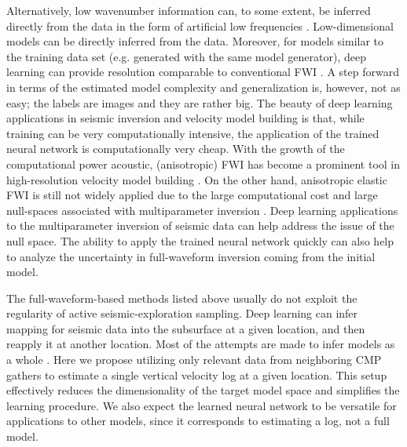 \documentclass[paper,twocolomn]{geophysics}
\begin{document}
Alternatively, low wavenumber information can, to some extent, be inferred directly from the data in the form of artificial low frequencies \citep{ovcharenkoNeuralNetworkBased2017, ovcharenkoLowFrequencyDataExtrapolation2018, ovcharenko2019deep, jin2018learn, sunLowFrequencyExtrapolation2018, sun2019extrapolated, kazei2019realistically}. Low-dimensional models \citep[e.g.][]{polo2018, wu2018inversionnet} can be directly inferred from the data. Moreover, for models similar to the training data set (e.g. generated with the same model generator), deep learning can provide resolution comparable to conventional FWI \citep{farris2018tomography, araya2020fast}. A step forward in terms of the estimated model complexity and generalization is, however, not as easy; the labels are images and they are rather big. The beauty of deep learning applications in seismic inversion and velocity model building is that, while training can be very computationally intensive, the application of the trained neural network is computationally very cheap. With the growth of the computational power acoustic, (anisotropic) FWI has become a prominent tool in high-resolution velocity model building \citep[e.g.][]{warner2013}. On the other hand, anisotropic elastic FWI is still not widely applied due to the large computational cost and large null-spaces associated with multiparameter inversion \citep{kohn2015,kazei2018,kazei2019scattering, podgornovaResolutionVTIAnisotropy2018}. Deep learning applications to the multiparameter inversion of seismic data \citep{ivanov2017traveltime, dramsch2019deep, zhang2019regularized} can help address the issue of the null space.
The ability to apply the trained neural network quickly can also help to analyze the uncertainty in full-waveform inversion coming from the initial model.



The full-waveform-based methods listed above usually do not exploit the regularity of active seismic-exploration sampling. Deep learning can infer mapping for seismic data into the subsurface at a given location, and then reapply it at another location. Most of the attempts are made to infer models as a whole \citep{richardson2018seismic, wu2018inversionnet, zhang2018velocitygan, yang2019deep, oye2019velocity, farris2018tomography, araya2019deep, araya2020fast}. Here we propose utilizing only relevant data from neighboring CMP gathers to estimate a single vertical velocity log at a given location. This setup effectively reduces the dimensionality of the target model space and simplifies the learning procedure. We also expect the learned neural network to be versatile for applications to other models, since it corresponds to estimating a log, not a full model.
\end{document}
